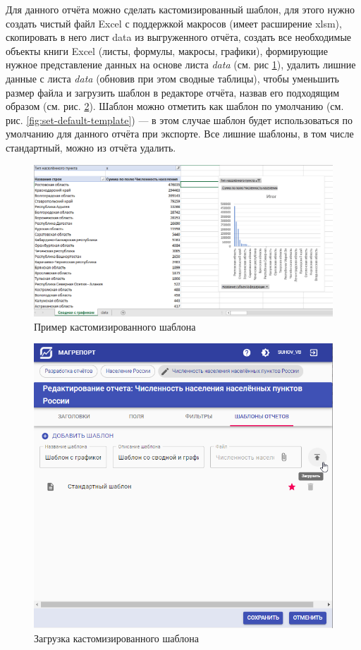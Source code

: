 \documentclass[../user-manual.tex]{subfiles}
\begin{document}
	Для данного отчёта можно сделать кастомизированный шаблон, для этого нужно создать чистый файл Excel с поддержкой макросов (имеет расширение xlsm), скопировать в него лист data из выгруженного отчёта, создать все необходимые объекты книги Excel (листы, формулы, макросы, графики), формирующие нужное представление данных на основе листа \textit{data} (см. рис \ref{fig:excel-pivot}), удалить лишние данные с листа \textit{data} (обновив при этом сводные таблицы), чтобы уменьшить размер файла и загрузить шаблон в редакторе отчёта, назвав его подходящим образом (см. рис. \ref{fig:excel-template-uploading}). Шаблон можно отметить как шаблон по умолчанию (см. рис. \ref{fig:set-default-template}) --- в этом случае шаблон будет использоваться по умолчанию для данного отчёта при экспорте. Все лишние шаблоны, в том числе стандартный, можно из отчёта удалить.
	
	\begin{figure}[h]
		\centering
		\includegraphics[width=\graphicswidth]{img/14-excel-pivot.png}
		\caption{Пример кастомизированного шаблона}
		\label{fig:excel-pivot}
	\end{figure}	
	
	\begin{figure}[h]
		\centering
		\includegraphics[width=\graphicswidth]{img/15-excel-template-uploading.png}
		\caption{Загрузка кастомизированного шаблона}
		\label{fig:excel-template-uploading}
	\end{figure}	
	
\end{document}
